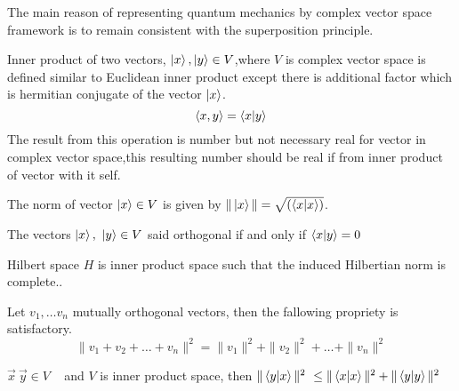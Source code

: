 The main reason of representing quantum mechanics by complex vector space framework is to remain consistent with the superposition principle.
\begin{defn}\label{Innerpro}

Inner product of two vectors, $\ket{x} ,\ket{y }\in V$,where $V$ is complex vector space is defined similar to Euclidean inner product except there is additional factor which is hermitian conjugate of the vector $\ket{x}$.
$$\left\langle x,y\right\rangle=\bra{x}\ket{y }$$
The result from this operation is number but not necessary real for vector in complex vector space,this resulting number should be real if from inner product of vector with it self.
\end{defn}
\begin{defn}

The norm of vector $\ket{x} \in V$ is given by $\| \ket{x}\|=\sqrt{\left(\bra{x}\ket{x}\right)}$.
\end{defn}

\begin{defn}[orthogonal]

The vectors $\ket{x},~ \ket{y} \in V$ said orthogonal if and only if $\bra{x}\ket{y}=0$
\end{defn}

\begin{defn}

Hilbert space $H$ is inner product space such that the induced Hilbertian norm is complete.\citep{book:4365}.
\end{defn}

\begin{defn}[Pythagoras]

Let $v_1,\dots v_n$ mutually orthogonal vectors, then the fallowing propriety is satisfactory.
$$\|v_1+v_2+\dots+v_n\|^2=\| v_1\|^2+\| v_2\|^2+\dots +\| v_n\|^2$$
\end{defn}

\begin{defn}\label{CSC}

$\vec{x} ~\vec{y} \in V $ ~ and $V$ is inner product space,
then $\|\bra{y}\ket{x}\|^2~\leq \| \braket{x}{x} \|^2+\|\bra{y} \ket{y} \|^2$
\end{defn}

